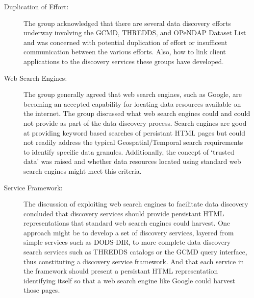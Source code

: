 \begin{description}
\item[Duplication of Effort:]  The group acknowledged that there are several 
  data discovery efforts underway involving the GCMD, THREDDS, and 
  OPeNDAP Dataset List and was concerned with potential duplication of 
  effort or insufficent communication between the various efforts.  Also, 
  how to link client applications to the discovery services these groups 
  have developed.

\item[Web Search Engines:]  The group generally agreed that web search engines,
  such as Google, are becoming an accepted capability for locating data
  resources available on the internet.  The group discussed what web
  search engines could and could not provide as part of the data 
  discovery process.  Search engines are good at providing keyword based
  searches of persistant HTML pages but could not readily address the
  typical Geospatial/Temporal search requirements to identify specific
  data granules.  Additionally, the concept of `trusted data' was raised
  and whether data resources located using standard web search engines 
  might meet this criteria.  

\item[Service Framework:]  The discussion of exploiting web search engines 
  to facilitate data discovery concluded that discovery services should
  provide persistant HTML representations that standard web search 
  engines could harvest.  One approach might be to develop a set of 
  discovery services, layered from simple services such as DODS-DIR, 
  to more complete data discovery search services such as THREDDS catalogs
  or the GCMD query interface, thus constituting a discovery service 
  framework.  And that each service in the framework should present a 
  persistant HTML representation identifying itself so that a web search 
  engine like Google could harvest those pages.


\end{description}

